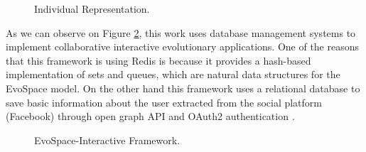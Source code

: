 \begin{figure}
	\captionsetup{justification=centering,margin=2cm}
	\centering
	\setlength\fboxsep{0pt}
	\setlength\fboxrule{0.7pt}
	\caption{Individual Representation.}
	\label{fig:individualRep}
\end{figure}

As we can observe on Figure \ref{fig:ESFramework}, this work uses database
management systems to implement collaborative interactive evolutionary
applications. One of the reasons that this framework is using Redis \cite{redis} is
because it provides a hash-based implementation of sets and queues, which are
natural data structures for the EvoSpace model. On the other hand this framework
uses a relational database to save basic information about the user extracted
from the social platform (Facebook) through open graph API and OAuth2
authentication \cite{facebook}.
\begin{figure}
	\captionsetup{justification=centering,margin=2cm}
	\centering
	\setlength\fboxsep{0pt}
	\setlength\fboxrule{0.7pt}
	\caption{EvoSpace-Interactive Framework.}
	\label{fig:ESFramework}
\end{figure}


